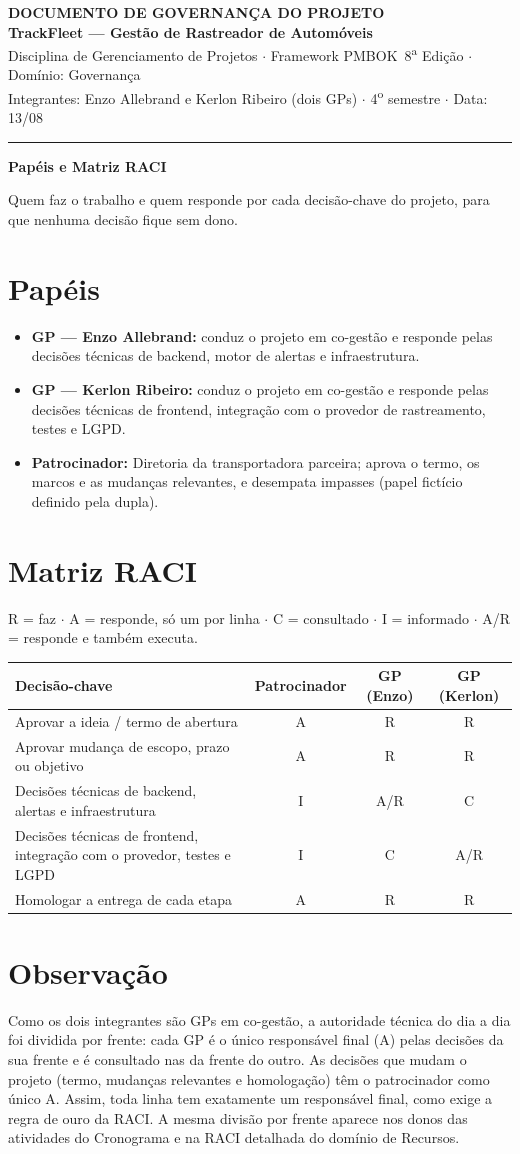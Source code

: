 \documentclass[11pt,a4paper]{article}
\newcommand{\cabecalho}[3]{%
  \begin{center}
  {\Large\bfseries DOCUMENTO DE #1 DO PROJETO}\\[2pt]
  {\large\bfseries TrackFleet --- Gestão de Rastreador de Automóveis}\\[4pt]
  Disciplina de Gerenciamento de Projetos $\cdot$ Framework PMBOK\textregistered\ 8\textsuperscript{a} Edição $\cdot$ Domínio: #2\\[2pt]
  Integrantes: Enzo Allebrand e Kerlon Ribeiro (dois GPs) $\cdot$ 4\textsuperscript{o} semestre $\cdot$ Data: #3
  \end{center}
  \vspace{2mm}\hrule\vspace{4mm}}
\newcommand{\parte}[1]{\noindent\textbf{\large #1}\par\vspace{1mm}}
\begin{document}
\cabecalho{GOVERNANÇA}{Governança}{13/08}

\parte{Papéis e Matriz RACI}
\noindent Quem faz o trabalho e quem responde por cada decisão-chave do projeto, para que nenhuma decisão fique sem dono.

\section{Papéis}
\begin{itemize}[itemsep=3pt]
  \item \textbf{GP --- Enzo Allebrand:} conduz o projeto em co-gestão e responde pelas decisões técnicas de backend, motor de alertas e infraestrutura.
  \item \textbf{GP --- Kerlon Ribeiro:} conduz o projeto em co-gestão e responde pelas decisões técnicas de frontend, integração com o provedor de rastreamento, testes e LGPD.
  \item \textbf{Patrocinador:} Diretoria da transportadora parceira; aprova o termo, os marcos e as mudanças relevantes, e desempata impasses (papel fictício definido pela dupla).
\end{itemize}

\section{Matriz RACI}
R = faz $\cdot$ A = responde, só um por linha $\cdot$ C = consultado $\cdot$ I = informado $\cdot$ A/R = responde e também executa.

\begin{center}
\begin{tabularx}{\textwidth}{L c c c}
\toprule
\textbf{Decisão-chave} & \textbf{Patrocinador} & \textbf{GP (Enzo)} & \textbf{GP (Kerlon)} \\
\midrule
Aprovar a ideia / termo de abertura & A & R & R \\
Aprovar mudança de escopo, prazo ou objetivo & A & R & R \\
Decisões técnicas de backend, alertas e infraestrutura & I & A/R & C \\
Decisões técnicas de frontend, integração com o provedor, testes e LGPD & I & C & A/R \\
Homologar a entrega de cada etapa & A & R & R \\
\bottomrule
\end{tabularx}
\end{center}

\section{Observação}
Como os dois integrantes são GPs em co-gestão, a autoridade técnica do dia a dia foi dividida por frente: cada GP é o único responsável final (A) pelas decisões da sua frente e é consultado nas da frente do outro. As decisões que mudam o projeto (termo, mudanças relevantes e homologação) têm o patrocinador como único A. Assim, toda linha tem exatamente um responsável final, como exige a regra de ouro da RACI. A mesma divisão por frente aparece nos donos das atividades do Cronograma e na RACI detalhada do domínio de Recursos.
\end{document}
